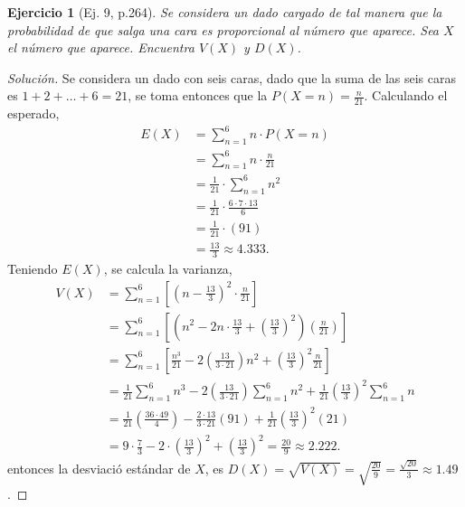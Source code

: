 \documentclass[12pt,letterpaper]{article}
\newtheorem{ej}{Ejercicio}
\begin{document}
\begin{ej}[Ej. 9, p.264]
Se considera un dado cargado de tal manera que la probabilidad de que salga una cara es proporcional al número que aparece. Sea $X$ el número que aparece. Encuentra $V(X)$ y $D(X)$.
\end{ej}
\begin{proof}[Solución]
Se considera un dado con seis caras, dado que la suma de las seis caras es  $1+2+\dots+6 = 21$, se toma entonces que la  $P(X = n) = \frac{n}{21}$. Calculando el esperado, 
	\begin{align}
		E(X) &= \sum_{n= 1}^{6} n \cdot P(X = n)\\
		&= \sum_{n = 1}^{6} n \cdot \frac{n}{21}\\
		&= \frac{1}{21} \cdot \sum_{n = 1}^{6} n^2 \\
		&= \frac{1}{21} \cdot \frac{6 \cdot 7 \cdot 13}{6}\\
		&= \frac{1}{21} \cdot  (91) \\
		&= \frac{13}{3} \approx 4.333.
	\end{align}
Teniendo $E(X)$, se calcula la varianza,
	\begin{align}
		V(X) &= \sum_{n = 1}^{6} \left\lbrack \left(n-\frac{13}{3}\right)^2 \cdot \frac{n}{21} \right\rbrack\\
		&= \sum_{n = 1}^{6} \left\lbrack \left(n^2 - 2n\cdot\frac{13}{3}+ \left(\frac{13}{3}\right)^2\right) \left(\frac{n}{21}\right) \right\rbrack\\
		&= \sum_{n = 1}^{6} \left\lbrack \frac{n^3}{21} - 2 \left(\frac{13}{3 \cdot 21}\right) n^2 + \left(\frac{13}{3}\right)^2 \frac{n}{21} \right\rbrack \\
		&= \frac{1}{21} \sum_{n = 1}^{6}  n^3 - 2 \left(\frac{13}{3 \cdot 21}\right) \sum_{n= 1}^{6} n^2 + \frac{1}{21}\left(\frac{13}{3}\right)^2 \sum_{n = 1}^{6} n \\
		&= \frac{1}{21} \left(\frac{36 \cdot 49}{4}\right) - \frac{2 \cdot 13}{3 \cdot 21} (91) + \frac{1}{21} \left(\frac{13}{3}\right)^2 (21)\\
		&= 9 \cdot \frac{7}{3} - 2 \cdot \left(\frac{13}{3}\right)^2 + \left(\frac{13}{3}\right)^2 = \frac{20}{9}\approx 2.222.
	\end{align}
	entonces la desviació estándar de $X$, es $D(X) = \sqrt{V(X)} = \sqrt{\frac{20}{9}} = \frac{\sqrt{20}}{3} \approx 1.49$.
\end{proof}
 

\end{document}
